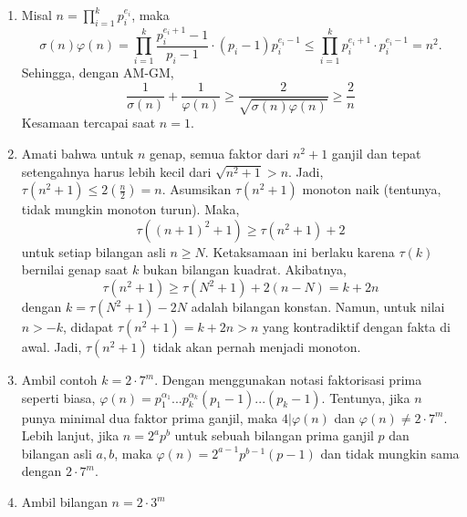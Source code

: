 \documentclass[11pt]{scrartcl}
\begin{document}
\begin{enumerate}
\begin{enumerate}
        Lebih lanjut, jika $m$ habis dibagi oleh $5^2$ atau bilangan prima yang lebih dari $7$, haruslah $v_3(m) = 1$. Dikarenakan $(2\cdot 3 + 1) = 7$ dan $3^1 = 3$, maka ruas $p_2^{a_2}...p_k^{a_k} = \frac{7}{3}(4a_2 + 1)...(4a_k + 1)$. Hal ini mengakibatkan $7|m$. Karena $\frac{7^2}{4\cdot 2 + 1} > \frac{7}{3}$, maka $v_7(m) = 1$ dan persamaan menjadi $p_2^{a_2}p_4^{a_4}...p_k^{a_k} = \frac{5}{3}(4a_2 + 1)(4a_4 + 1)...(4a_k + 1)$. Hal ini mengindikasikan bahwa $5|m$. Namun, karena $\frac{5^2}{4\cdot 2 + 1} > \frac{7}{3}$, maka $v_5(m) = 1$. Substitusi nilai ini dan diperoleh bahwa tidak ada solusinya.

        Sehingga, $m$ hanya habis dibagi oleh bilangan prima $3$ dan $5$. Dapat dicek bahwa hanya $m = 3, 5, 15$ yang memenuhi. Sehingga, ada empat solusi: $1, 3^4, 5^4, 15^4$.
    \end{enumerate}
    \item Misal $n= \prod\limits_{i=1}^kp_i^{e_i}$, maka $$\sigma(n)\varphi(n) =\prod_{i=1}^k \frac{p_i^{e_i+1}-1}{p_i-1} \cdot (p_i-1)p_i^{e_i-1}\le \prod_{i=1}^k p_i^{e_i+1}\cdot p_i^{e_i-1} = n^2.$$ Sehingga, dengan AM-GM, $$\frac{1}{\sigma(n)} + \frac{1}{\varphi(n)}\ge \frac{2}{\sqrt{\sigma(n)\varphi(n)}} \ge \frac{2}{n}$$ Kesamaan tercapai saat $n = 1$.
    \item Amati bahwa untuk $n$ genap, semua faktor dari $n^2 + 1$ ganjil dan tepat setengahnya harus lebih kecil dari $\sqrt{n^2 + 1} > n$. Jadi, $\tau(n^2 + 1) \leq 2(\frac{n}{2}) = n$.
    Asumsikan $\tau(n^2 + 1)$ monoton naik (tentunya, tidak mungkin monoton turun). Maka, \[\tau((n + 1)^2 + 1) \geq \tau(n^2 + 1) + 2\] untuk setiap bilangan asli $n \geq N$. Ketaksamaan ini berlaku karena $\tau(k)$ bernilai genap saat $k$ bukan bilangan kuadrat. Akibatnya, \[\tau(n^2 + 1) \geq \tau(N^2 + 1) + 2(n - N) = k + 2n\] dengan $k = \tau(N^2 + 1) - 2N$ adalah bilangan konstan. Namun, untuk nilai $n > -k$, didapat $\tau(n^2 + 1) = k + 2n > n$ yang kontradiktif dengan fakta di awal. Jadi, $\tau(n^2 + 1)$ tidak akan pernah menjadi monoton.
    \item Ambil contoh $k = 2\cdot 7^m$. Dengan menggunakan notasi faktorisasi prima seperti biasa, $\varphi(n) = p_1^{\alpha_1}...p_k^{\alpha_k}(p_1 - 1)...(p_k - 1)$. Tentunya, jika $n$ punya minimal dua faktor prima ganjil, maka $4|\varphi(n)$ dan $\varphi(n) \neq 2\cdot 7^m$. Lebih lanjut, jika $n = 2^ap^b$ untuk sebuah bilangan prima ganjil $p$ dan bilangan asli $a, b$, maka $\varphi(n) = 2^{a - 1}p^{b - 1}(p - 1)$ dan tidak mungkin sama dengan $2\cdot 7^m$.
    \item Ambil bilangan $n = 2\cdot 3^m$

\end{enumerate}
\end{document}
